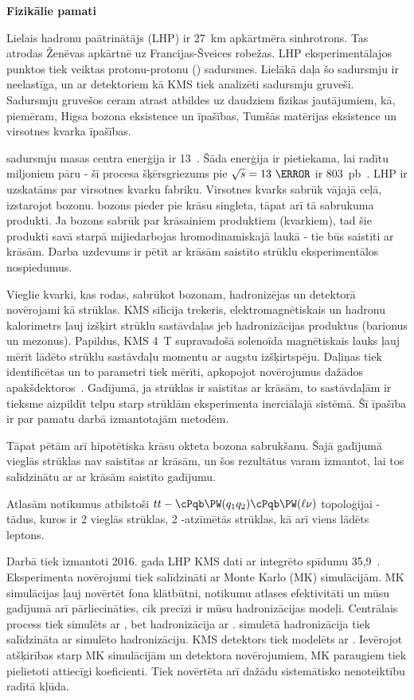 \vskip 1.5cm
\medskip
\textbf{Fizikālie pamati}
\nopagebreak\medskip

Lielais hadronu paātrinātājs (LHP) ir 27~km apkārtmēra sinhrotrons. Tas atrodas Ženēvas apkārtnē uz Francijas-Šveices robežas. LHP eksperimentālajos punktos tiek veiktas protonu-protonu (\Pp\Pp) sadursmes. Lielākā daļa šo sadursmju ir neelastīga, un ar detektoriem kā KMS tiek analizēti sadursmju gruveši. Sadursmju gruvešos ceram atrast atbildes uz daudziem fizikas jautājumiem, kā, piemēram, Higsa bozona eksistence un īpašības, Tumšās matērijas eksistence un virsotnes kvarka īpašības.

\Pp\Pp sadursmju masas centra enerģija ir 13~\TeV. Šāda enerģija ir pietiekama, lai radītu miljoniem \ttbar pāru - šī procesa šķērsgriezums pie $\sqrt{s}=13~\TeV$ ir 803~pb~\cite{Sirunyan:2018goh}. LHP ir uzskatāms par \gls{virsotnes kvarku} fabriku. Virsotnes kvarks sabrūk vājajā ceļā, izstarojot \PW bozonu. \PW bozons pieder pie krāsu singleta, tāpat arī tā sabrukuma produkti. Ja \PW bozons sabrūk par krāsainiem produktiem (kvarkiem), tad šie produkti savā starpā mijiedarbojas hromodinamiskajā laukā - tie būs saistīti ar krāsām. Darba uzdevums ir pētīt ar krāsām saistīto strūklu eksperimentālos nospiedumus.

Vieglie kvarki, kas rodas, sabrūkot \PW bozonam, hadronizējas un detektorā novērojami kā \gls{strūklas}. KMS silīcija trekeris, elektromagnētiskais un hadronu kalorimetrs ļauj izšķirt strūklu sastāvdaļas jeb hadronizācijas produktus (barionus un mezonus). Papildus, KMS 4~T supravadošā solenoīda magnētiskais lauks ļauj mērīt lādēto strūklu sastāvdaļu momentu ar augstu izšķirtspēju. Daļiņas tiek identificētas un to parametri tiek mērīti, apkopojot novērojumus dažādos apakšdektoros~\cite{Sirunyan:2017ulk}. Gadījumā, ja strūklas ir saistītas ar krāsām, to sastāvdaļām ir tieksme aizpildīt telpu starp strūklām eksperimenta inerciālajā sistēmā. Šī īpašība ir par pamatu darbā izmantotajām metodēm.

Tāpat pētām arī hipotētiska krāsu okteta \PW bozona sabrukšanu. Šajā gadījumā vieglās strūklas nav saistītas ar krāsām, un šos rezultātus varam izmantot, lai tos salīdzinātu ar ar krāsām saistīto gadījumu.

Atlasām notikumus atbilstoši $tt-\cPqb\PW(q_1q_2)\cPqb\PW(\ell\nu)$ topoloģijai - tādus, kuros ir 2 vieglās strūklas, 2 \cPqb-atzīmētās strūklas, kā arī viens lādēts leptons.

Darbā tiek izmantoti 2016. gada LHP KMS dati ar integrēto spīdumu 35,9~\fbinv. Eksperimenta novērojumi tiek salīdzināti ar Monte Karlo (MK) simulācijām. MK simulācijas ļauj novērtēt fona klātbūtni, notikumu atlases efektivitāti un mūsu gadījumā arī pārliecināties, cik precīzi ir mūsu hadronizācijas modeļi. Centrālais process tiek simulēts ar \POWHEG, bet hadronizācija ar \PYTHIA. \PYTHIA simulētā hadronizācija tiek salīdzināta ar \HERWIGpp simulēto hadronizāciju. KMS detektors tiek modelēts ar \GEANTfour. Ievērojot atšķirības starp MK simulācijām un detektora novērojumiem, MK paraugiem tiek pielietoti attiecīgi koeficienti. Tiek novērtēta arī dažādu sistemātisko nenoteiktību radītā kļūda.

